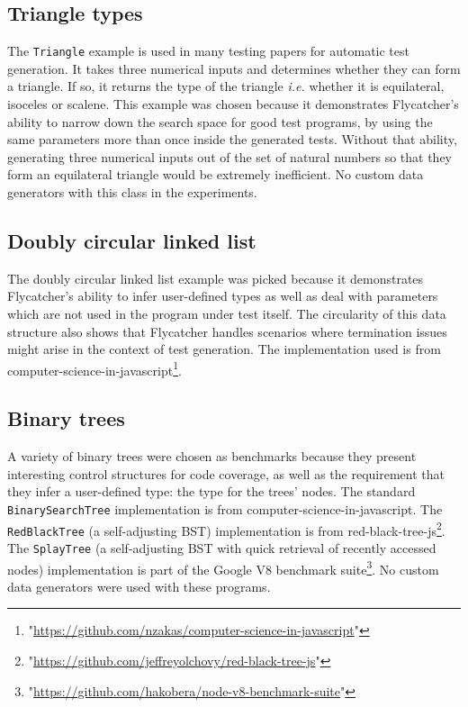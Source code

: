 \subsection{Triangle types}
The \texttt{Triangle} example is used in many testing papers for automatic test generation. It takes three numerical inputs and determines whether they can form a triangle. If so, it returns the type of the triangle \emph{i.e.} whether it is equilateral, isoceles or scalene. This example was chosen because it demonstrates \textsf{Flycatcher}'s ability to narrow down the search space for good test programs, by using the same parameters more than once inside the generated tests. Without that ability, generating three numerical inputs out of the set of natural numbers so that they form an equilateral triangle would be extremely inefficient. No custom data generators with this class in the experiments.

\subsection{Doubly circular linked list}
The doubly circular linked list example was picked because it demonstrates \textsf{Flycatcher}'s ability to infer user-defined types as well as deal with parameters which are not used in the program under test itself. The circularity of this data structure also shows that \textsf{Flycatcher} handles scenarios where termination issues might arise in the context of test generation. The implementation used is from \textsf{computer-science-in-javascript}\footnote{"\url{https://github.com/nzakas/computer-science-in-javascript}"}.

\subsection{Binary trees}
A variety of binary trees were chosen as benchmarks because they present interesting control structures for code coverage, as well as the requirement that they infer a user-defined type: the type for the trees' nodes. The standard \texttt{BinarySearchTree} implementation is from \textsf{computer-science-in-javascript}\footnotemark[2]. The \texttt{RedBlackTree} (a self-adjusting BST) implementation is from \textsf{red-black-tree-js}\footnote{"\url{https://github.com/jeffreyolchovy/red-black-tree-js}"}. The \texttt{SplayTree} (a self-adjusting BST with quick retrieval of recently accessed nodes) implementation is part of the Google V8 benchmark suite\footnote{"\url{https://github.com/hakobera/node-v8-benchmark-suite}"}. No custom data generators were used with these programs.

